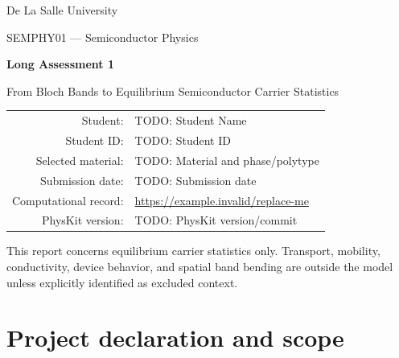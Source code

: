 \documentclass[11pt,a4paper]{article}
\newcommand{\studentname}{TODO: Student Name}
\newcommand{\studentid}{TODO: Student ID}
\newcommand{\materialname}{TODO: Material and phase/polytype}
\newcommand{\submissiondate}{TODO: Submission date}
\newcommand{\repositoryurl}{https://example.invalid/replace-me}
\newcommand{\physkitversion}{TODO: PhysKit version/commit}
\begin{document}
\begin{titlepage}
  \centering
  {\Large De La Salle University\par}
  \vspace{8mm}
  {\large SEMPHY01 --- Semiconductor Physics\par}
  \vspace{18mm}
  {\Huge\bfseries Long Assessment 1\par}
  \vspace{4mm}
  {\LARGE From Bloch Bands to Equilibrium Semiconductor Carrier Statistics\par}
  \vspace{18mm}

  \begin{tabular}{@{}rl@{}}
    Student: & \studentname \\
    Student ID: & \studentid \\
    Selected material: & \materialname \\
    Submission date: & \submissiondate \\
    Computational record: & \url{\repositoryurl} \\
    PhysKit version: & \physkitversion
  \end{tabular}

  \vfill
  \begin{minipage}{0.88\textwidth}
    \small
    This report concerns equilibrium carrier statistics only. Transport,
    mobility, conductivity, device behavior, and spatial band bending are
    outside the model unless explicitly identified as excluded context.
  \end{minipage}
\end{titlepage}

\tableofcontents
\clearpage
{}

\section{Project declaration and scope}
\label{sec:declaration}
\end{document}
